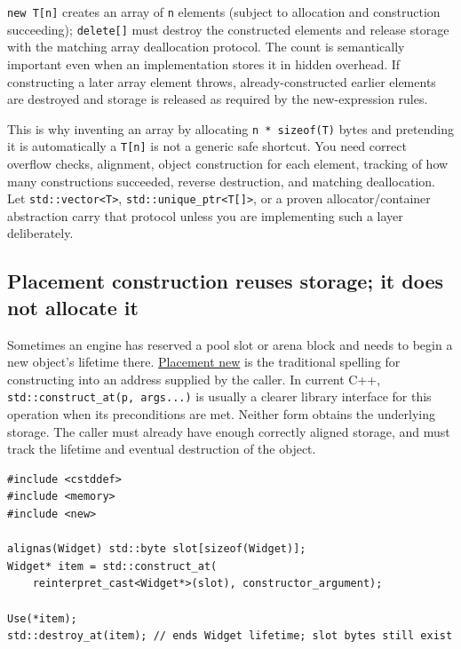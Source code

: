 \texttt{new\ T{[}n{]}} creates an array of \texttt{n} elements (subject to allocation and construction succeeding); \texttt{delete{[}{]}} must destroy the constructed elements and release storage with the matching array deallocation protocol. The count is semantically important even when an implementation stores it in hidden overhead. If constructing a later array element throws, already-constructed earlier elements are destroyed and storage is released as required by the new-expression rules.

This is why inventing an array by allocating \texttt{n\ *\ sizeof(T)} bytes and pretending it is automatically a \texttt{T{[}n{]}} is not a generic safe shortcut. You need correct overflow checks, alignment, object construction for each element, tracking of how many constructions succeeded, reverse destruction, and matching deallocation. Let \texttt{std::vector\textless{}T\textgreater{}}, \texttt{std::unique\_ptr\textless{}T{[}{]}\textgreater{}}, or a proven allocator/container abstraction carry that protocol unless you are implementing such a layer deliberately.

\subsection{Placement construction reuses storage; it does not allocate it}\label{01-foundations-i-ch004-placement-construction-reuses-storage-it-does-not-allocate-it}

Sometimes an engine has reserved a pool slot or arena block and needs to begin a new object's lifetime there. \hyperref[appendix-f56c3e43fd4e]{Placement new} is the traditional spelling for constructing into an address supplied by the caller. In current C++, \texttt{std::construct\_at(p,\ args...)} is usually a clearer library interface for this operation when its preconditions are met. Neither form obtains the underlying storage. The caller must already have enough correctly aligned storage, and must track the lifetime and eventual destruction of the object.

\begin{verbatim}
#include <cstddef>
#include <memory>
#include <new>

alignas(Widget) std::byte slot[sizeof(Widget)];
Widget* item = std::construct_at(
    reinterpret_cast<Widget*>(slot), constructor_argument);

Use(*item);
std::destroy_at(item); // ends Widget lifetime; slot bytes still exist
\end{verbatim}

